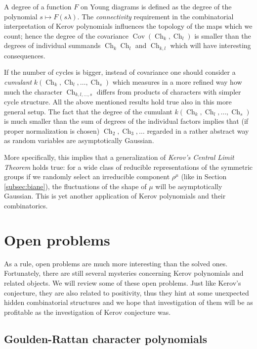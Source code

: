 \documentclass{emsprocart}
\theoremstyle{definition}
\begin{document}
A degree of a function $F$ on Young diagrams is defined as the degree of the polynomial $s\mapsto F(s\lambda)$.
The \emph{connectivity} requirement in the combinatorial interpretation of Kerov polynomials
influences the topology of the maps which we count; hence the degree of the covariance
$\operatorname{Cov}(\operatorname{Ch}_k,\operatorname{Ch}_l)$
is smaller than the degrees of individual summands 
$\operatorname{Ch}_k \operatorname{Ch}_l$ and $\operatorname{Ch}_{k,l}$ which will have interesting consequences.

If the number of cycles is bigger, instead of covariance one should consider a \emph{cumulant} $k(\operatorname{Ch}_k,\operatorname{Ch}_l,\dots,\operatorname{Ch}_s)$
which measures in a more refined way how much the character $\operatorname{Ch}_{k,l,\dots,s}$ differs from products of characters
with simpler cycle structure. All the above mentioned results hold true also in this more general setup. 
The fact that the degree of the cumulant $k(\operatorname{Ch}_k,\operatorname{Ch}_l,\dots,\operatorname{Ch}_s)$ is much smaller than the sum of degrees of 
the individual factors implies that (if proper normalization is chosen)   
$\operatorname{Ch}_2,\operatorname{Ch}_3,\dots$ regarded in a rather abstract way as random variables are asymptotically Gaussian. 

More specifically, this implies that a generalization of 
\emph{Kerov's Central Limit Theorem} holds true: for a wide class of reducible representations of the symmetric groups
if we randomly select an irreducible component $\rho^\mu$ (like in Section \ref{subsec:biane}), the fluctuations of the shape of $\mu$
will be asymptotically Gaussian. This is yet another application of Kerov polynomials and their combinatorics.

\section{Open problems}

As a rule, open problems are much more interesting than the solved ones. 
Fortunately, there are still several mysteries concerning Kerov polynomials and related
objects. 
We will review some of these open problems.
Just like Kerov's conjecture, they are also related to positivity, thus they
hint at some unexpected hidden combinatorial structures and we hope that investigation of them will
be as profitable as the investigation of Kerov conjecture was.

\subsection{Goulden-Rattan character polynomials}
\end{document}
